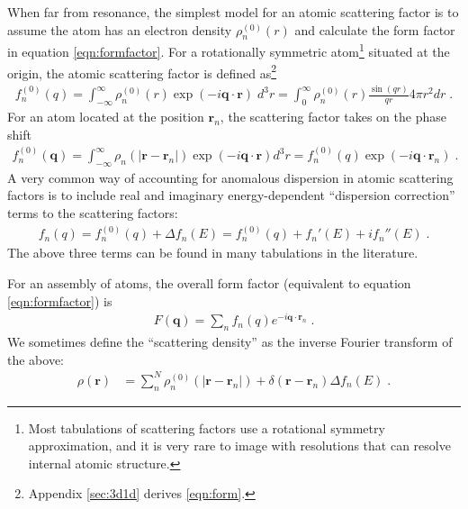 \documentclass[12pt]{article}
\renewcommand{\vec}[1]{\boldsymbol{#1}}
\begin{document}
When far from resonance, the simplest model for an atomic scattering 
factor is to assume the atom has an
electron density $\rho_n^{(0)}(r)$ and calculate the form factor in equation 
\ref{eqn:formfactor}.  For a rotationally symmetric atom\footnote{Most 
tabulations of scattering factors use a rotational symmetry approximation, and 
it is very rare to image with resolutions that can resolve internal atomic 
structure.} situated at the origin, the atomic scattering factor is defined
as\footnote{Appendix \ref{sec:3d1d} derives \ref{eqn:form}.}
\begin{align}
f_n^{(0)}(q)  = \int_{-\infty}^\infty \rho_n^{(0)}(r) \exp(-i 
\vec{q}\cdot\vec{r}) \; d^3r = \int_0^\infty \rho_n^{(0)}(r)   
\frac{\sin(qr)}{qr}  4\pi r^2 dr \; . \label{eqn:form}
\end{align}
For an atom located at the position $\vec{r}_n$, the scattering factor takes on 
the phase shift
\begin{align}
f_n^{(0)}(\vec{q})  = \int_{-\infty}^\infty \rho_n(|\vec{r}-\vec{r}_n|) \exp(-i 
\vec{q}\cdot\vec{r}) d^3r = f_n^{(0)}(q)
\exp(-i \vec{q}\cdot\vec{r}_n)  \; .
\end{align}
A very common way of accounting for anomalous dispersion in atomic scattering 
factors is to include real and imaginary energy-dependent ``dispersion 
correction'' terms to the scattering factors:
\begin{align}
f_n(q) = f_n^{(0)}(q) + \Delta f_n(E) = f_n^{(0)}(q) + f_n'(E) + i f_n''(E)  \;.
\end{align}
The above three terms can be found in many tabulations in the literature.

For an assembly of atoms, the overall form factor (equivalent to equation 
\ref{eqn:formfactor}) is
\begin{align}
F(\vec{q})  = \sum_n f_n(q)
e^{-i \vec{q}\cdot\vec{r}_n}  \; .
\end{align}
We sometimes define the ``scattering density'' as the inverse 
Fourier transform of the above:
\begin{align}\label{eqn:scatterdens}
\rho(\vec{r})  &= \sum_n^N \rho_n^{(0)}(|\vec{r}-\vec{r}_n|) +  
\delta(\vec{r}-\vec{r}_n) \Delta f_n(E) \; .
\end{align}


% 
% 
% 
\end{document}
